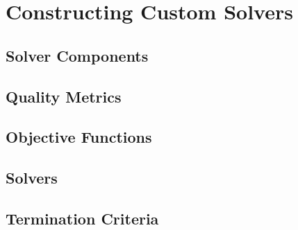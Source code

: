 \chapter{Constructing Custom Solvers}

\section{Solver Components}

\section{Quality Metrics}

\section{Objective Functions}

\section{Solvers}

\section{Termination Criteria}
